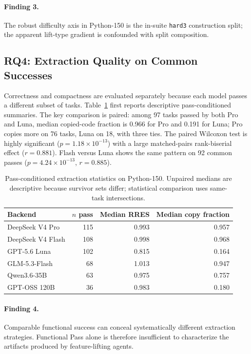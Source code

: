 \documentclass[acmsmall,screen,review,anonymous]{acmart}
\begin{document}
\paragraph{Finding 3.}
The robust difficulty axis in Python-150 is the in-suite \texttt{hard3}
construction split; the apparent lift-type gradient is confounded with split
composition.

\subsection{RQ4: Extraction Quality on Common Successes}

Correctness and compactness are evaluated separately because each model passes a
different subset of tasks. Table~\ref{tab:compactness} first reports descriptive
pass-conditioned summaries. The key comparison is paired: among 97 tasks passed by
both Pro and Luna, median copied-code fraction is 0.966 for Pro and 0.191 for Luna;
Pro copies more on 76 tasks, Luna on 18, with three ties. The paired Wilcoxon test is
highly significant ($p=1.18\times10^{-13}$) with a large matched-pairs
rank-biserial effect ($r=0.881$). Flash versus Luna shows the same pattern on 92
common passes ($p=4.24\times10^{-13}$, $r=0.885$).

\begin{table}[t]
  \caption{Pass-conditioned extraction statistics on Python-150. Unpaired medians
  are descriptive because survivor sets differ; statistical comparison uses
  same-task intersections.}
  \label{tab:compactness}
  \centering
  \begin{tabular}{lrrr}
    \toprule
    \textbf{Backend} & \textbf{$n$ pass} & \textbf{Median RRES} & \textbf{Median copy fraction} \\
    \midrule
    DeepSeek V4 Pro & 115 & 0.993 & 0.957 \\
    DeepSeek V4 Flash & 108 & 0.998 & 0.968 \\
    GPT-5.6 Luna & 102 & 0.815 & 0.164 \\
    GLM-5.3-Flash & 68 & 1.013 & 0.947 \\
    Qwen3.6-35B & 63 & 0.975 & 0.757 \\
    GPT-OSS 120B & 36 & 0.983 & 0.180 \\
    \bottomrule
  \end{tabular}
\end{table}

\paragraph{Finding 4.}
Comparable functional success can conceal systematically different extraction
strategies. Functional Pass alone is therefore insufficient to characterize the
artifacts produced by feature-lifting agents.
\end{document}
